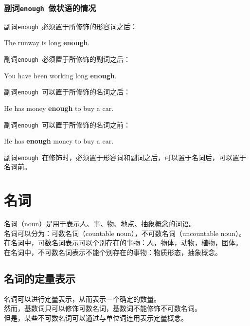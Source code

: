 \documentclass[UTF8]{ctexart}
\begin{document}
\newpage

\subsubsection{副词\texttt{enough~}做状语的情况}
    副词\texttt{enough~}必须置于所修饰的形容词之后：
    \begin{center}
        \large
        \ttfamily
        The runway is long \textbf{enough}.
    \end{center}\vspace{10pt}
    副词\texttt{enough~}必须置于所修饰的副词之后：
    \begin{center}
        \large
        \ttfamily
        You have been working long \textbf{enough}.
    \end{center}\vspace{10pt}
    副词\texttt{enough~}可以置于所修饰的名词之后：
    \begin{center}
        \large
        \ttfamily
        He has money \textbf{enough} to buy a car.
    \end{center}\vspace{10pt}
    副词\texttt{enough~}可以置于所修饰的名词之前：
    \begin{center}
        \large
        \ttfamily
        He has \textbf{enough} money to buy a car.
    \end{center}\vspace{10pt}
    副词\texttt{enough~}在修饰时，必须置于形容词和副词之后，可以置于名词后，可以置于名词前。

\newpage

\section{名词}
    名词（{\ttfamily noun}）是用于表示人、事、物、地点、抽象概念的词语。\\[3mm]
    名词可以分为：可数名词（{\ttfamily countable noun}），不可数名词（{\ttfamily uncountable noun}）。\\[3mm]
    在名词中，可数名词表示可以个别存在的事物：人，物体，动物，植物，团体。\\[3mm]
    在名词中，不可数名词表示不能个别存在的事物：物质形态，抽象概念。

\subsection{名词的定量表示}
    名词可以进行定量表示，从而表示一个确定的数量。\\[3mm]
    然而，基数词只可以修饰可数名词，基数词不能修饰不可数名词。\\[3mm]
    但是，某些不可数名词可以通过与单位词连用表示定量概念。
\end{document}
